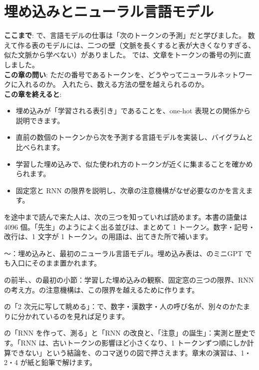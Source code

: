 \chapter{埋め込みとニューラル言語モデル}\label{ch:embedding}


\begin{chapterlead}
\textbf{ここまで}: で、言語モデルの仕事は「次のトークンの予測」だと学びました。
数えて作る表のモデルには、二つの壁（文脈を長くすると表が大きくなりすぎる、似た文脈から学べない）がありました。
では、文章をトークンの番号の列に直しました。\\[1mm]
\textbf{この章の問い}: ただの番号であるトークンを、どうやってニューラルネットワークに入れるのか。
入れたら、数える方法の壁を越えられるのか。\\[1mm]
\textbf{この章を終えると}:
\begin{itemize}
\item 埋め込みが「学習される表引き」であることを、one-hot 表現との関係から説明できます。
\item 直前の数個のトークンから次を予測する言語モデルを実装し、バイグラムと比べられます。
\item 学習した埋め込みで、似た使われ方のトークンが近くに集まることを確かめられます。
\item 固定窓と RNN の限界を説明し、次章の注意機構がなぜ必要なのかを言えます。
\end{itemize}
\end{chapterlead}

\begin{readingguide}
\item[\rgpre] を途中まで読んで来た人は、次の三つを知っていれば読めます。本書の語彙は 4096 個。「先生」のようによく出る並びは、まとめて 1 トークン。数字・記号・改行は、1 文字が 1 トークン。の用語は、出てきた所で補います。
\item[\rgmust] 〜：埋め込みと、最初のニューラル言語モデル。埋め込み表は、のミニGPT でも入口にそのまま置かれます。
\item[\rgmust] の前半、、の最初の小節：学習した埋め込みの観察、固定窓の三つの限界、RNN の考え方。の注意機構は、この限界を越えるために作ります。
\item[\rgskim] の「2 次元に写して眺める」：で、数字・漢数字・人の呼び名が、別々のかたまりに分かれているのを見れば足ります。
\item[\rgskim] の「RNN を作って、測る」と「RNN の改良と、「注意」の誕生」：実測と歴史です。「RNN は、古いトークンの影響ほど小さくなり、1 トークンずつ順にしか計算できない」という結論を、のコマ送りの図で押さえます。章末の演習は、1・2・4 が紙と鉛筆で解けます。
\end{readingguide}

